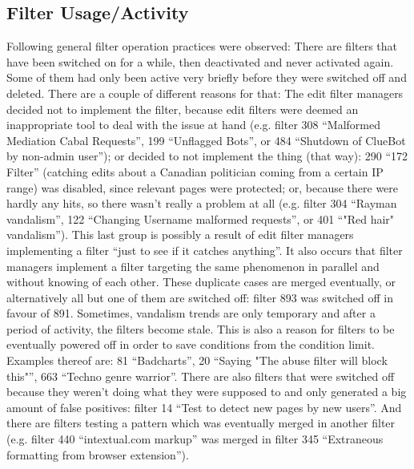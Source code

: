 \subsection{Filter Usage/Activity}

Following general filter operation practices were observed:
There are filters that have been switched on for a while, then deactivated and never activated again.
Some of them had only been active very briefly before they were switched off and deleted.
There are a couple of different reasons for that:
The edit filter managers decided not to implement the filter, because edit filters were deemed an inappropriate tool to deal with the issue at hand (e.g. filter 308 ``Malformed Mediation Cabal Requests'', 199 ``Unflagged Bots'', or 484 ``Shutdown of ClueBot by non-admin user'');
or decided to not implement the thing (that way): 290 ``172 Filter'' (catching edits about a Canadian politician coming from a certain IP range) was disabled, since relevant pages were protected;
or, because there were hardly any hits, so there wasn't really a problem at all (e.g. filter 304 ``Rayman vandalism'', 122 ``Changing Username malformed requests'', or 401 ``"Red hair" vandalism'').
This last group is possibly a result of edit filter managers implementing a filter ``just to see if it catches anything''.
It also occurs that filter managers implement a filter targeting the same phenomenon in parallel and without knowing of each other.
These duplicate cases are merged eventually, or alternatively all but one of them are switched off: filter 893 was switched off in favour of 891.
Sometimes, vandalism trends are only temporary and after a period of activity, the filters become stale.
This is also a reason for filters to be eventually powered off in order to save conditions from the condition limit.
Examples thereof are: 81 ``Badcharts'', 20 ``Saying "The abuse filter will block this"'', 663 ``Techno genre warrior''.
There are also filters that were switched off because they weren't doing what they were supposed to and only generated a big amount of false positives: filter 14 ``Test to detect new pages by new users''.
And there are filters testing a pattern which was eventually merged in another filter (e.g. filter 440 ``intextual.com markup'' was merged in filter 345 ``Extraneous formatting from browser extension'').

